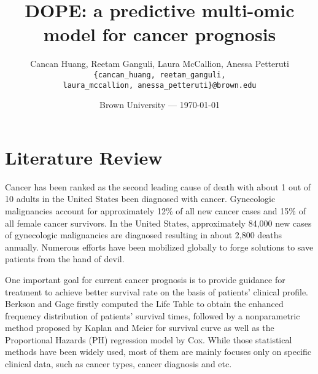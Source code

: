 \documentclass{article}
\title{DOPE: a predictive multi-omic model for cancer prognosis} %
\author{Cancan Huang, Reetam Ganguli, Laura McCallion, Anessa Petteruti\\ \texttt{\{cancan\_huang, reetam\_ganguli,} \\ \texttt{laura\_mccallion, anessa\_petteruti\}@brown.edu}} %
\date{Brown University --- \today} %
\begin{document}
\maketitle %

\vspace{-1cm}
\section*{Literature Review} %

Cancer has been ranked as the second leading cause of death with about 1 out of 10 adults in the United States been diagnosed with cancer\cite{aruleba2020applications,siegel2019cancer}. Gynecologic malignancies account for approximately 12\% of all new cancer cases and 15\% of all female cancer survivors\cite{salani2017update}. In the United States, approximately 84,000 new cases of gynecologic malignancies are diagnosed resulting in about 2,800 deaths annually\cite{stewart2013gynecologic}. Numerous efforts have been mobilized globally to forge solutions to save patients from the hand of devil.



One important goal for current cancer prognosis is to provide guidance for treatment to achieve better survival rate on the basis of patients' clinical profile. 
Berkson and Gage\cite{rp1950calculation} firstly computed the Life Table to obtain the enhanced frequency distribution of patients' survival times, followed by a nonparametric method proposed by Kaplan and Meier\cite{kaplan1958nonparametric} for survival curve as well as the Proportional Hazards (PH) regression model by Cox\cite{cox1972regression}. While those statistical methods have been widely used, most of them are mainly focuses only on specific clinical data, such as cancer types, cancer diagnosis and etc.
\end{document}

